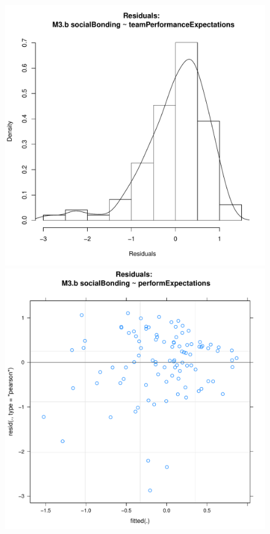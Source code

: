 \documentclass[12pt]{report}
\begin{document}
{\begin{figure}[htbp]
  \includegraphics[scale =.4]{../images/MLM3bHist.pdf}
  \includegraphics[scale =.4]{../images/MLM3bScatter.pdf}

\end{figure}}
\end{document}
